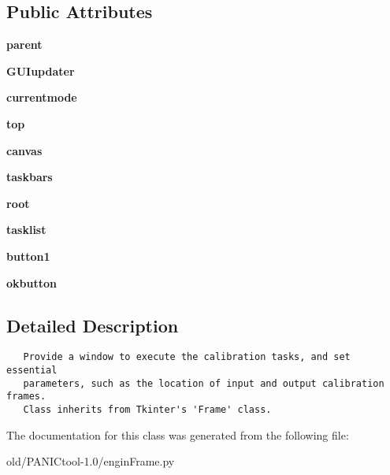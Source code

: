 \subsection*{Public Attributes}
\begin{CompactItemize}
\item 
\textbf{parent}\label{classenginFrame_1_1window_eef677aa71694ca3b693524d6025dc44}

\item 
\textbf{GUIupdater}\label{classenginFrame_1_1window_836fd2e0ffe696063bd80cdd6d9f2665}

\item 
\textbf{currentmode}\label{classenginFrame_1_1window_ce0958eee7f8172b06b577546f37918c}

\item 
\textbf{top}\label{classenginFrame_1_1window_5d56f21afe0d103e777d9b2f8a7c5bc0}

\item 
\textbf{canvas}\label{classenginFrame_1_1window_f648108fa82f2a365bc431f495772bdd}

\item 
\textbf{taskbars}\label{classenginFrame_1_1window_c3dd027c632c7bbd187a746a69fd6fe2}

\item 
\textbf{root}\label{classenginFrame_1_1window_ba00a841b0f1cba909d7fa63cc95d3db}

\item 
\textbf{tasklist}\label{classenginFrame_1_1window_4cc5b86f0ff1828c73a58bf555ee8300}

\item 
\textbf{button1}\label{classenginFrame_1_1window_e57cfbda5d1d48209a26e6cb66c2dd43}

\item 
\textbf{okbutton}\label{classenginFrame_1_1window_a8994c844c6ccbd687e16720aebff99a}

\end{CompactItemize}


\subsection{Detailed Description}


\footnotesize\begin{verbatim}
   Provide a window to execute the calibration tasks, and set essential
   parameters, such as the location of input and output calibration frames.
   Class inherits from Tkinter's 'Frame' class.
\end{verbatim}
\normalsize
 



The documentation for this class was generated from the following file:\begin{CompactItemize}
\item 
old/PANICtool-1.0/engin\-Frame.py\end{CompactItemize}
